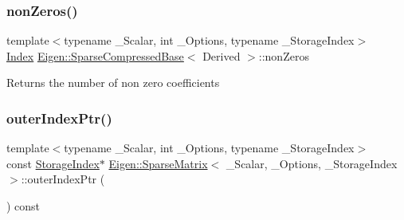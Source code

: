 \subsubsection{\texorpdfstring{nonZeros()}{nonZeros()}}
{\footnotesize\ttfamily template$<$typename \+\_\+\+Scalar, int \+\_\+\+Options, typename \+\_\+\+Storage\+Index$>$ \\
\mbox{\hyperlink{struct_eigen_1_1_eigen_base_a554f30542cc2316add4b1ea0a492ff02}{Index}} \mbox{\hyperlink{class_eigen_1_1_sparse_compressed_base}{Eigen\+::\+Sparse\+Compressed\+Base}}$<$ Derived $>$\+::non\+Zeros\hspace{0.3cm}{\ttfamily [inline]}}

\begin{DoxyReturn}{Returns}
the number of non zero coefficients 
\end{DoxyReturn}
\mbox{\label{class_eigen_1_1_sparse_matrix_a75506964d86d6badb32d0b4917acf2e2}} 
\subsubsection{\texorpdfstring{outerIndexPtr()}{outerIndexPtr()}\hspace{0.1cm}{\footnotesize\ttfamily [1/2]}}
{\footnotesize\ttfamily template$<$typename \+\_\+\+Scalar, int \+\_\+\+Options, typename \+\_\+\+Storage\+Index$>$ \\
const \mbox{\hyperlink{class_eigen_1_1_sparse_matrix_base_a0b540ba724726ebe953f8c0df06081ed}{Storage\+Index}}$\ast$ \mbox{\hyperlink{class_eigen_1_1_sparse_matrix}{Eigen\+::\+Sparse\+Matrix}}$<$ \+\_\+\+Scalar, \+\_\+\+Options, \+\_\+\+Storage\+Index $>$\+::outer\+Index\+Ptr (\begin{DoxyParamCaption}{ }\end{DoxyParamCaption}) const\hspace{0.3cm}{\ttfamily [inline]}}

